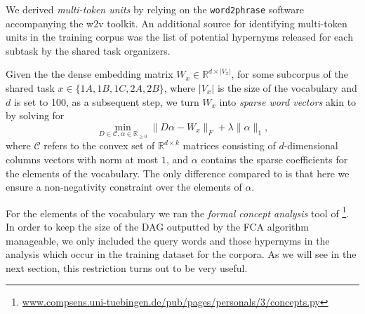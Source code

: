 \documentclass[11pt,a4paper]{article}
\begin{document}
We derived \emph{multi-token units} by relying on the \texttt{word2phrase} software accompanying the w2v toolkit. An additional source for identifying multi-token units in the training corpus was the list of potential hypernyms released for each subtask by the shared task organizers.

Given the the dense embedding matrix $W_x \in \mathbb{R}^{d \times \lvert V_x
\rvert}$, 
for some subcorpus of the shared task $x\in\{1A, 1B, 1C, 2A, 2B\}$, 
where $\lvert V_x \rvert$ is the size of the vocabulary and $d$ is set
to 100,
as a subsequent step, we turn $W_x$ into
\emph{sparse word vectors} akin to \citet{Berend:2017} by solving for
\begin{equation}
\min\limits_{D \in \mathcal{C}, \alpha \in \mathbb{R}_{\geq0}} \lVert D\alpha - W_{x} \rVert_F + \lambda \lVert \alpha \rVert_1,
\label{nonneg_SPAMS_objective}
\end{equation}
where $\mathcal{C}$ refers to the convex set of $\mathbb{R}^{ d \times k}$ 
matrices consisting of $d$-dimensional columns vectors
with norm at most $1$, and $\alpha$ contains the sparse coefficients for the elements of the vocabulary. The only difference
compared to \citet{Berend:2017} is that here we ensure a non-negativity
constraint over the elements of $\alpha$.

For the elements of the vocabulary we ran the \emph{formal concept analysis} tool of
\citet{Endres:2010}\footnote{\url{www.compsens.uni-tuebingen.de/pub/pages/personals/3/concepts.py}}.
In order to keep the size of the DAG outputted by the FCA algorithm manageable,
we only included the query words and those hypernyms in the analysis which
occur in the training dataset for the corpora.
As we will see in the next section, this restriction turns out to be very useful.
\end{document}
